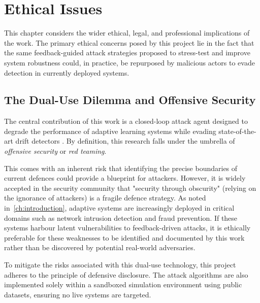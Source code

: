 \chapter{Ethical Issues}
\label{ch:ethics}


This chapter considers the wider ethical, legal, and professional implications of the work. The primary ethical concerns posed by this project lie in the fact that the same feedback-guided attack strategies proposed to stress-test and improve system robustness could, in practice, be repurposed by malicious actors to evade detection in currently deployed systems.

\section{The Dual-Use Dilemma and Offensive Security}
The central contribution of this work is a closed-loop attack agent designed to degrade the performance of adaptive learning systems while evading state-of-the-art drift detectors \cite{Korycki_2022, Kuppa_2022}. By definition, this research falls under the umbrella of \textit{offensive security} or \textit{red teaming}.

This comes with an inherent risk that identifying the precise boundaries of current defences could provide a blueprint for attackers. However, it is widely accepted in the security community that "security through obscurity" (relying on the ignorance of attackers) is a fragile defence strategy. As noted in~\cref{ch:introduction}, adaptive systems are increasingly deployed in critical domains such as network intrusion detection and fraud prevention. If these systems harbour latent vulnerabilities to feedback-driven attacks, it is ethically preferable for these weaknesses to be identified and documented by this work rather than be discovered by potential real-world adversaries.

To mitigate the risks associated with this dual-use technology, this project adheres to the principle of defensive disclosure. The attack algorithms are also implemented solely within a sandboxed simulation environment using public datasets, ensuring no live systems are targeted.

